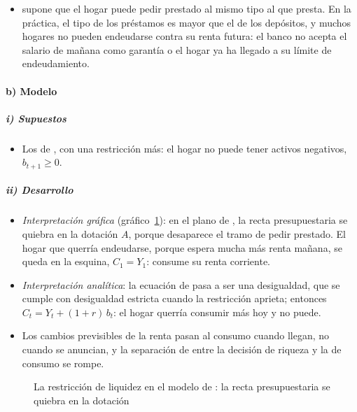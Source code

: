 \documentclass[11pt]{article}
\begin{document}
\begin{itemize}
\item {} supone que el hogar puede pedir prestado al mismo tipo al que presta. En la práctica, el tipo de los préstamos es mayor que el de los depósitos, y muchos hogares no pueden endeudarse contra su renta futura: el banco no acepta el salario de mañana como garantía o el hogar ya ha llegado a su límite de endeudamiento.
\end{itemize}

\paragraph{b) Modelo}

\subparagraph{i) Supuestos}

\begin{itemize}
\item Los de , con una restricción más: el hogar no puede tener activos negativos, $b_{t+1}\geq 0$.
\end{itemize}

\subparagraph{ii) Desarrollo}

\begin{itemize}
\item \emph{Interpretación gráfica} (gráfico~\ref{fig:fisher-liquidez}): en el plano de , la recta presupuestaria se quiebra en la dotación $A$, porque desaparece el tramo de pedir prestado. El hogar que querría endeudarse, porque espera mucha más renta mañana, se queda en la esquina, $C_1=Y_1$: consume su renta corriente.
\item \emph{Interpretación analítica}: la ecuación de  pasa a ser una desigualdad,
  que se cumple con desigualdad estricta cuando la restricción aprieta; entonces $C_t=Y_t+(1+r)\,b_t$: el hogar querría consumir más hoy y no puede.
\item Los cambios previsibles de la renta pasan al consumo cuando llegan, no cuando se anuncian, y la separación de  entre la decisión de riqueza y la de consumo se rompe.
\end{itemize}

\begin{figure}[H]
\centering
\caption{La restricción de liquidez en el modelo de : la recta presupuestaria se quiebra en la dotación}\label{fig:fisher-liquidez}
\end{figure}
\end{document}
